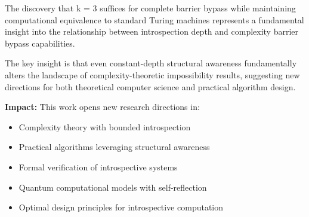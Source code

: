 \documentclass[11pt]{article}
\begin{document}
The discovery that k = 3 suffices for complete barrier bypass while maintaining computational equivalence to standard Turing machines represents a fundamental insight into the relationship between introspection depth and complexity barrier bypass capabilities.

The key insight is that even constant-depth structural awareness fundamentally alters the landscape of complexity-theoretic impossibility results, suggesting new directions for both theoretical computer science and practical algorithm design.

\textbf{Impact:} This work opens new research directions in:
\begin{itemize}
\item Complexity theory with bounded introspection
\item Practical algorithms leveraging structural awareness
\item Formal verification of introspective systems
\item Quantum computational models with self-reflection
\item Optimal design principles for introspective computation
\end{itemize}
\end{document}
